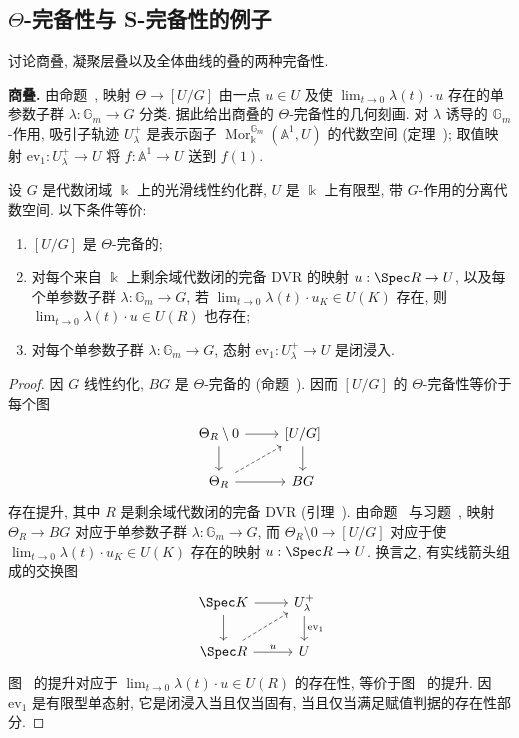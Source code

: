 \subsection{\texorpdfstring{$\Theta$}{Θ}-完备性与 S-完备性的例子}\label{src:7.9.4-subsection}
讨论商叠, 凝聚层叠以及全体曲线的叠的两种完备性.

\textbf{商叠.} 由命题~, 映射 $\Theta\to[U/G]$ 由一点 $u\in U$ 及使 $\lim_{t\to0}\lambda(t)\cdot u$ 存在的单参数子群 $\lambda:\mathbb G_m\to G$ 分类. 据此给出商叠的 $\Theta$-完备性的几何刻画. 对 $\lambda$ 诱导的 $\mathbb G_m$-作用, 吸引子轨迹 $U_\lambda^+$ 是表示函子 $\operatorname{Mor}_{\Bbbk}^{\mathbb G_m}(\mathbb A^1,U)$ 的代数空间 (定理~); 取值映射 $\mathrm{ev}_1:U_\lambda^+\to U$ 将 $f:\mathbb A^1\to U$ 送到 $f(1)$.
\begin{proposition}\label{src:7.9.24}
设 $G$ 是代数闭域 $\Bbbk$ 上的光滑线性约化群, $U$ 是 $\Bbbk$ 上有限型, 带 $G$-作用的分离代数空间. 以下条件等价:
\begin{enumerate}[(1)]
\item $[U/G]$ 是 $\Theta$-完备的;
\item 对每个来自 $\Bbbk$ 上剩余域代数闭的完备 DVR 的映射 $u:\Spec R\to U$, 以及每个单参数子群 $\lambda:\mathbb G_m\to G$, 若 $\lim_{t\to0}\lambda(t)\cdot u_K\in U(K)$ 存在, 则 $\lim_{t\to0}\lambda(t)\cdot u\in U(R)$ 也存在;
\item 对每个单参数子群 $\lambda:\mathbb G_m\to G$, 态射 $\mathrm{ev}_1:U_\lambda^+\to U$ 是闭浸入.
\end{enumerate}
\end{proposition}
\begin{proof}
因 $G$ 线性约化, $BG$ 是 $\Theta$-完备的 (命题~). 因而 $[U/G]$ 的 $\Theta$-完备性等价于每个图
\begin{align}\label{src:7.9.25}
\begin{tikzcd}[ampersand replacement=\&]\Theta_R\setminus0\arrow[r]\arrow[d]\&{[U/G]}\arrow[d]\\\Theta_R\arrow[r]\arrow[ur,dashed]\&BG\end{tikzcd}
\end{align}
存在提升, 其中 $R$ 是剩余域代数闭的完备 DVR (引理~). 由命题~ 与习题~, 映射 $\Theta_R\to BG$ 对应于单参数子群 $\lambda:\mathbb G_m\to G$, 而 $\Theta_R\setminus0\to[U/G]$ 对应于使 $\lim_{t\to0}\lambda(t)\cdot u_K\in U(K)$ 存在的映射 $u:\Spec R\to U$. 换言之, 有实线箭头组成的交换图
\begin{align}\label{src:7.9.26}
\begin{tikzcd}[ampersand replacement=\&]\Spec K\arrow[r]\arrow[d]\&U_\lambda^+\arrow[d,"{\mathrm{ev}_1}"]\\\Spec R\arrow[r,"{u}"]\arrow[ur,dashed]\&U\end{tikzcd}
\end{align}
图~ 的提升对应于 $\lim_{t\to0}\lambda(t)\cdot u\in U(R)$ 的存在性, 等价于图~ 的提升. 因 $\mathrm{ev}_1$ 是有限型单态射, 它是闭浸入当且仅当固有, 当且仅当满足赋值判据的存在性部分.
\end{proof}
